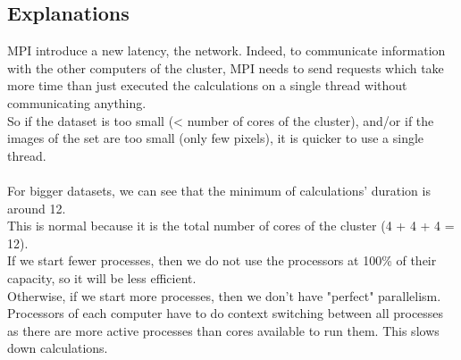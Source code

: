 \subsection{Explanations}
MPI introduce a new latency, the network. Indeed, to communicate information with the other computers of the cluster, MPI needs to send requests which take more time than just executed the calculations on a single thread without communicating anything.\\
So if the dataset is too small (< number of cores of the cluster), and/or if the images of the set are too small (only few pixels), it is quicker to use a single thread.\\
\\
For bigger datasets, we can see that the minimum of calculations' duration is around 12.\\
This is normal because it is the total number of cores of the cluster (4 + 4 + 4 = 12).\\
If we start fewer processes, then we do not use the processors at 100\% of their capacity, so it will be less efficient.\\
Otherwise, if we start more processes, then we don't have "perfect" parallelism. Processors of each computer have to do context switching between all processes as there are more active processes than cores available to run them. This slows down calculations.
